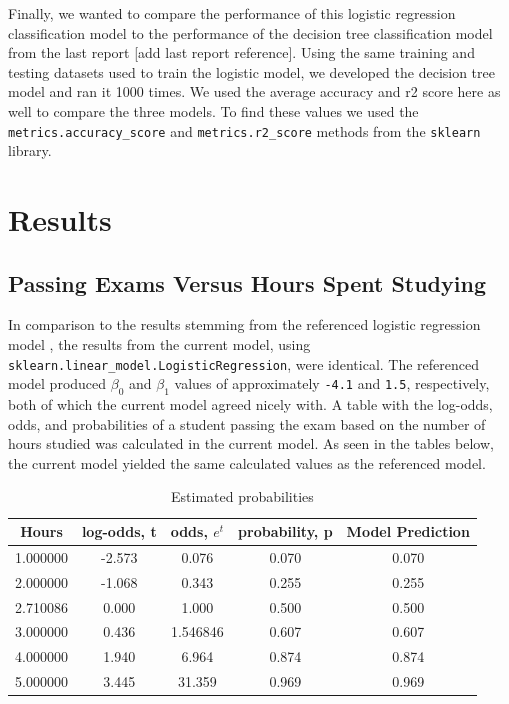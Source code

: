 \documentclass[journal]{IEEEtran}
\begin{document}
Finally, we wanted to compare the performance of this logistic regression classification model to the performance of the decision tree classification model from the last report [add last report reference]. Using the same training and testing datasets used to train the logistic model, we developed the decision tree model and ran it 1000 times. We used the average accuracy and r2 score here as well to compare the three models. To find these values we used the \lstinline{metrics.accuracy_score} and \lstinline{metrics.r2_score} methods from the \lstinline{sklearn} library. 

\section{Results}

\subsection{Passing Exams Versus Hours Spent Studying}

In comparison to the results stemming from the referenced logistic regression model \cite{b3}, the results from the current model, using \lstinline{sklearn.linear_model.LogisticRegression}, were identical. The referenced model produced $\beta_0$ and $\beta_1$ values of approximately \lstinline{-4.1} and \lstinline{1.5}, respectively, both of which the current model agreed nicely with. A table with the log-odds, odds, and probabilities of a student passing the exam based on the number of hours studied was calculated in the current model. As seen in the tables below, the current model yielded the same calculated values as the referenced model.

\begin{table}[h!]
\centering
\begin{tabular}{ c c c c c }
    Hours &	log-odds, t &	odds, \(e^t\) &	probability, p &	Model Prediction \\ 
\hline
1.000000 &	-2.573 &	0.076 &	0.070 &	0.070 \\
2.000000 &	-1.068 &	0.343 &	0.255 &	0.255 \\
2.710086 &	0.000 &	1.000 &	0.500 &	0.500 \\
3.000000 &	0.436 &	1.546846 &	0.607 &	0.607 \\
4.000000 &	1.940 &	6.964 &	0.874 &	0.874 \\
5.000000 &	3.445 &	31.359 &	0.969 &	0.969
\end{tabular}
\caption{Estimated probabilities}
\label{table:log-odds-table}
\end{table}
\end{document}
